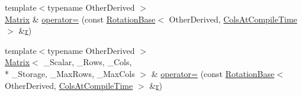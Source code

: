\begin{DoxyCompactItemize}
\item 
{\footnotesize template$<$typename Other\-Derived $>$ }\\\hyperlink{class_matrix}{Matrix} \& \hyperlink{class_matrix_a965d89141b92f209b1194f52f44bf69a}{operator=} (const \hyperlink{class_rotation_base}{Rotation\-Base}$<$ Other\-Derived, \hyperlink{class_matrix_base_aaa53a8ec1bc1ba52b1e50631dac15d6da359babfd1277ae780433d99b383e00e8}{Cols\-At\-Compile\-Time} $>$ \&\hyperlink{glext_8h_abe08814c2f72843fde4d8df41440d5a0}{r})
\item 
{\footnotesize template$<$typename Other\-Derived $>$ }\\\hyperlink{class_matrix}{Matrix}$<$ \-\_\-\-Scalar, \-\_\-\-Rows, \-\_\-\-Cols, \\*
\-\_\-\-Storage, \-\_\-\-Max\-Rows, \-\_\-\-Max\-Cols $>$ \& \hyperlink{class_matrix_a257eed2ae8c4625b5d41b7559ff8f297}{operator=} (const \hyperlink{class_rotation_base}{Rotation\-Base}$<$ Other\-Derived, \hyperlink{class_matrix_base_aaa53a8ec1bc1ba52b1e50631dac15d6da359babfd1277ae780433d99b383e00e8}{Cols\-At\-Compile\-Time} $>$ \&\hyperlink{glext_8h_abe08814c2f72843fde4d8df41440d5a0}{r})
\end{DoxyCompactItemize}
